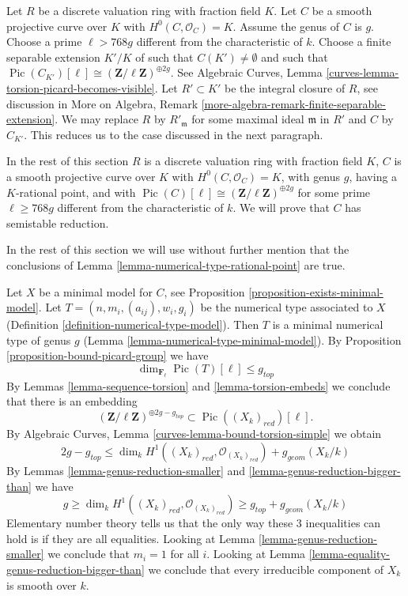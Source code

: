 \documentclass{stacks-project}
\theoremstyle{plain}
\theoremstyle{definition}
\theoremstyle{remark}
\numberwithin{equation}{subsection}
\def\Pic{\mathop{\mathrm{Pic}}\nolimits}
\begin{document}
\medskip\noindent
Let $R$ be a discrete valuation ring with fraction field $K$.
Let $C$ be a smooth projective curve over $K$ with $H^0(C, \mathcal{O}_C) = K$.
Assume the genus of $C$ is $g$.
Choose a prime $\ell > 768g$ different from the characteristic of $k$.
Choose a finite separable extension $K'/K$ of
such that $C(K') \not = \emptyset$ and such that
$\Pic(C_{K'})[\ell] \cong (\mathbf{Z}/\ell \mathbf{Z})^{\oplus 2g}$.
See
Algebraic Curves, Lemma \ref{curves-lemma-torsion-picard-becomes-visible}.
Let $R' \subset K'$ be the integral closure of $R$, see
discussion in More on Algebra, Remark
\ref{more-algebra-remark-finite-separable-extension}.
We may replace $R$ by $R'_{\mathfrak m}$ for some maximal ideal
$\mathfrak m$ in $R'$ and $C$ by $C_{K'}$. This
reduces us to the case discussed in the next paragraph.

\medskip\noindent
In the rest of this section
$R$ is a discrete valuation ring with fraction field $K$,
$C$ is a smooth projective curve over $K$ with $H^0(C, \mathcal{O}_C) = K$,
with genus $g$, having a $K$-rational point, and with
$\Pic(C)[\ell] \cong (\mathbf{Z}/\ell \mathbf{Z})^{\oplus 2g}$
for some prime $\ell \geq 768g$ different from the characteristic of $k$.
We will prove that $C$ has semistable reduction.

\medskip\noindent
In the rest of this section we will use without further mention
that the conclusions of Lemma \ref{lemma-numerical-type-rational-point}
are true.

\medskip\noindent
Let $X$ be a minimal model for $C$, see
Proposition \ref{proposition-exists-minimal-model}.
Let $T = (n, m_i, (a_{ij}), w_i, g_i)$
be the numerical type associated to $X$
(Definition \ref{definition-numerical-type-model}).
Then $T$ is a minimal numerical type of genus $g$
(Lemma \ref{lemma-numerical-type-minimal-model}).
By Proposition \ref{proposition-bound-picard-group}
we have
$$
\dim_{\mathbf{F}_\ell} \Pic(T)[\ell] \leq g_{top}
$$
By Lemmas \ref{lemma-sequence-torsion} and \ref{lemma-torsion-embeds}
we conclude that there is an embedding
$$
(\mathbf{Z}/\ell \mathbf{Z})^{\oplus 2g - g_{top}}
\subset \Pic((X_k)_{red})[\ell].
$$
By Algebraic Curves, Lemma \ref{curves-lemma-bound-torsion-simple} we obtain
$$
2g - g_{top} \leq
\dim_k H^1((X_k)_{red}, \mathcal{O}_{(X_k)_{red}}) + g_{geom}(X_k/k)
$$
By Lemmas \ref{lemma-genus-reduction-smaller} and
\ref{lemma-genus-reduction-bigger-than}
we have
$$
g \geq \dim_k H^1((X_k)_{red}, \mathcal{O}_{(X_k)_{red}}) \geq
g_{top} + g_{geom}(X_k/k)
$$
Elementary number theory tells us that the only way these $3$
inequalities can hold is if they are all equalities.
Looking at Lemma \ref{lemma-genus-reduction-smaller}
we conclude that $m_i = 1$ for all $i$.
Looking at Lemma \ref{lemma-equality-genus-reduction-bigger-than}
we conclude that every irreducible component of $X_k$
is smooth over $k$.
\end{document}
